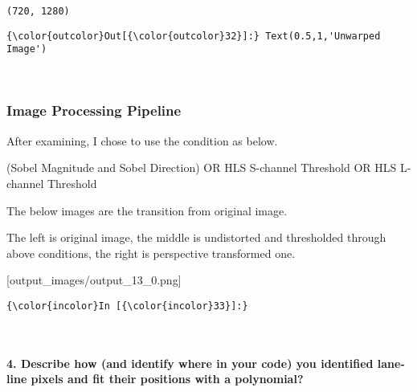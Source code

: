 \documentclass[11pt]{article}
\begin{document}
    \begin{Verbatim}[commandchars=\\\{\}]
(720, 1280)

    \end{Verbatim}

\begin{Verbatim}[commandchars=\\\{\}]
{\color{outcolor}Out[{\color{outcolor}32}]:} Text(0.5,1,'Unwarped Image')
\end{Verbatim}
            
    \begin{center}
    \end{center}
    { \hspace*{\fill} \\}
    
    \hypertarget{image-processing-pipeline}{%
\subsubsection{Image Processing
Pipeline}\label{image-processing-pipeline}}

After examining, I chose to use the condition as below.

(Sobel Magnitude and Sobel Direction) OR HLS S-channel Threshold OR HLS
L-channel Threshold

The below images are the transition from original image.

The left is original image, the middle is undistorted and thresholded
through above conditions, the right is perspective transformed one.

{[}output\_images/output\_13\_0.png{]}

    \begin{Verbatim}[commandchars=\\\{\}]
{\color{incolor}In [{\color{incolor}33}]:} 
\end{Verbatim}


    \begin{center}
    \end{center}
    { \hspace*{\fill} \\}
    
    \hypertarget{describe-how-and-identify-where-in-your-code-you-identified-lane-line-pixels-and-fit-their-positions-with-a-polynomial}{%
\paragraph{4. Describe how (and identify where in your code) you
identified lane-line pixels and fit their positions with a
polynomial?}\label{describe-how-and-identify-where-in-your-code-you-identified-lane-line-pixels-and-fit-their-positions-with-a-polynomial}}
\end{document}
